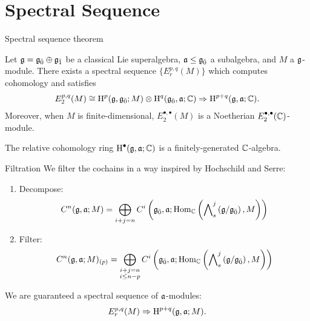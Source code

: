 \documentclass[handout]{beamer}
\begin{document}
\section{Spectral Sequence}

\begin{frame}{Spectral sequence theorem}\pause

  \begin{theorem}
    Let $\mathfrak{g} = {\mathfrak{g}}_{\bar{0}} \oplus {\mathfrak{g}}_{\bar{1}}$ be a classical Lie superalgebra, $\mathfrak{a} \leq {\mathfrak{g}}_{\bar{0}}$ a subalgebra, and $M$ a $\mathfrak{g}$-module. There exists a spectral sequence $\{E_r^{p,q}(M)\}$ which computes cohomology and satisfies
    \begin{align*}
      E_2^{p,q}(M) \cong \operatorname{H}^p(\mathfrak{g},{\mathfrak{g}}_{\bar{0}};M) \otimes \operatorname{H}^q({\mathfrak{g}}_{\bar{0}},\mathfrak{a};\mathbb{C}) \Rightarrow \operatorname{H}^{p+q}(\mathfrak{g},\mathfrak{a};\mathbb{C}).
    \end{align*}
    Moreover, when $M$ is finite-dimensional, $E_2^{\bullet,\bullet}(M)$ is a Noetherian $E_2^{\bullet,\bullet}(\mathbb{C})$-module.
  \end{theorem}
\pause
  \begin{corollary}
    The relative cohomology ring $\operatorname{H}^\bullet(\mathfrak{g},\mathfrak{a};\mathbb{C})$ is a finitely-generated $\mathbb{C}$-algebra.
  \end{corollary}
\end{frame}

\begin{frame}{Filtration}\pause
  We filter the cochains in a way inspired by Hochschild and Serre:\pause
  \begin{enumerate}
  \item Decompose:
    \[
      C^n(\mathfrak{g},\mathfrak{a};M) = \bigoplus_{i + j = n} C^i\left({\mathfrak{g}}_{\bar{0}},\mathfrak{a};\operatorname{Hom}_{\mathbb{C}}\left( \bigwedge\nolimits^{j}_s\left(\mathfrak{g}/{\mathfrak{g}}_{\bar{0}}\right),M\right)\right)
    \]\pause
  \item Filter:
    \[
      C^n(\mathfrak{g},\mathfrak{a};M)_{(p)} = \bigoplus_{\substack{i + j = n\\ i \leq n-p}} C^i\left({\mathfrak{g}}_{\bar{0}},\mathfrak{a};\operatorname{Hom}_{\mathbb{C}}\left( \bigwedge\nolimits^{j}_s\left(\mathfrak{g}/{\mathfrak{g}}_{\bar{0}}\right),M\right)\right)
    \]
    
  \end{enumerate}
\pause
  We are guaranteed a spectral sequence of $\mathfrak{a}$-modules:
  \[
    E_r^{p,q}(M) \Rightarrow \operatorname{H}^{p+q}(\mathfrak{g},\mathfrak{a};M).
  \]  
\end{frame}
\end{document}
